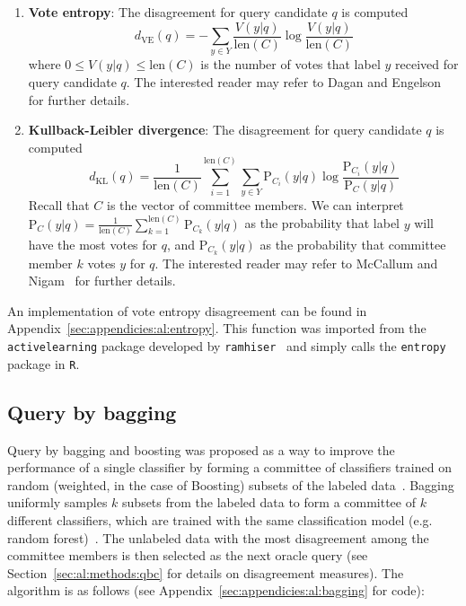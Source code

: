 \tablespacing
\begin{enumerate}
	\item \textbf{Vote entropy}: The disagreement for query candidate $q$ is 
	computed
	$$d_{\text{VE}}(q) =-\sum\limits_{y \in Y} 
	\frac{V(y|q)}{\text{len}(C)} \log \frac{V(y|q)}{\text{len}(C)}$$
	\noindent where $0 \leq V(y|q) \leq \text{len}(C)$ is the number of votes 
	that label $y$ received for query candidate $q$. 
	The interested reader may refer to Dagan and 
	Engelson~\cite{dagan1995} for further details.
	
	\item \textbf{Kullback-Leibler divergence}: The disagreement for query 
	candidate $q$ is computed
	$$d_{\text{KL}}(q) = \frac{1}{\text{len}(C)} \sum\limits_{i =
	1}^{\text{len}(C)} \sum\limits_{y \in Y} 
	\text{P}_{C_i}(y|q) \log \frac{\text{P}_{C_i}(y|q)}
	{\text{P}_{C}(y|q)}$$
	\noindent Recall that $C$ is the vector of committee members. We can 
	interpret $\text{P}_{C}(y|q) = \frac{1}{\text{len}(C)} 
	\sum\limits_{k=1}^{\text{len}(C)} \text{P}_{C_k}(y|q)$ as the probability 
	that label $y$ will have the most votes for $q$, and 
	$\text{P}_{C_k}(y|q)$ as the probability that committee member $k$ votes 
	$y$ for $q$. The interested reader may refer to McCallum and 
	Nigam~\cite{mccallum1998} for further details.
\end{enumerate}
\bodyspacing

\noindent An implementation of vote entropy disagreement can be found in 
Appendix~\ref{sec:appendicies:al:entropy}. This function was imported from the 
\texttt{activelearning} package developed by 
\texttt{ramhiser}~\cite{ramhiser2015} and simply calls the \texttt{entropy} 
package in \texttt{R}.









\subsection{Query by bagging}
\label{sec:al:methods:bagging}

Query by bagging and boosting was proposed
as a way to improve the performance of a single classifier by forming a 
committee of classifiers trained on random (weighted, in the case of Boosting) 
subsets of the labeled data~\cite{abe1998}. 
Bagging uniformly samples $k$ subsets from the labeled data to form a committee 
of $k$ different classifiers, which are trained with the same classification 
model (e.g. random forest)~\cite{abe1998}. The unlabeled data with the most 
disagreement among the committee members is then selected as the next oracle 
query (see Section~\ref{sec:al:methods:qbc} for details on disagreement 
measures). The algorithm is as follows (see 
Appendix~\ref{sec:appendicies:al:bagging} for code):

